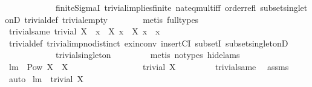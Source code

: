 \begin{isabellebody}
\ \ \ \ \ \ \ \ \ \ \ \ finite{\isacharunderscore}SigmaI\ trivial{\isacharunderscore}implies{\isacharunderscore}finite\ nat{\isacharunderscore}{}{\isacharunderscore}eq{\isacharunderscore}mult{\isacharunderscore}iff\ order{\isacharunderscore}refl\ subset{\isacharunderscore}singletonD\ trivial{\isacharunderscore}def\ trivial{\isacharunderscore}empty\isanewline
\ \ \ \ \ \ \isamarkupfalse%
\ {\isacharparenleft}metis\ {\isacharparenleft}full{\isacharunderscore}types{\isacharparenright}{\isacharparenright}%
\endisatagproof
{\isafoldproof}%
%
\isadelimproof
\isanewline
%
\endisadelimproof
\isanewline
{}\isamarkupfalse%
\ trivial{\isacharunderscore}same{\isacharcolon}\ {\isachardoublequoteopen}trivial\ X\ {\isacharequal}\ {\isacharparenleft}{\isasymforall}x{}\ {\isasymin}\ X{\isachardot}\ {\isasymforall}x{}\ {\isasymin}\ X{\isachardot}\ x{}\ {\isacharequal}\ x{}{\isacharparenright}{\isachardoublequoteclose}\ \isanewline
%
\isadelimproof
\ \ \ \ \ \ %
\endisadelimproof
%
\isatagproof
{}\isamarkupfalse%
\ trivial{\isacharunderscore}def\ trivial{\isacharunderscore}imp{\isacharunderscore}no{\isacharunderscore}distinct\ ex{\isacharunderscore}in{\isacharunderscore}conv\ insertCI\ subsetI\ subset{\isacharunderscore}singletonD\isanewline
\ \ \ \ \ \ \ \ \ \ \ \ trivial{\isacharunderscore}singleton\ \isanewline
\ \ \ \ \ \ \isamarkupfalse%
\ {\isacharparenleft}metis\ {\isacharparenleft}no{\isacharunderscore}types{\isacharcomma}\ hide{\isacharunderscore}lams{\isacharparenright}{\isacharparenright}%
\endisatagproof
{\isafoldproof}%
%
\isadelimproof
\isanewline
%
\endisadelimproof
\isanewline
{}\isamarkupfalse%
\ lm{}{}{\isacharcolon}\ \ {\isachardoublequoteopen}{\isacharparenleft}Pow\ X\ {\isasymsubseteq}\ {\isacharbraceleft}{\isacharbraceleft}{\isacharbraceright}{\isacharcomma}X{\isacharbraceright}{\isacharparenright}{\isachardoublequoteclose}\ \isanewline
\ \ \ \ \ \ \ \ \ \ \ \ \ \ \ \ {\isachardoublequoteopen}trivial\ X{\isachardoublequoteclose}\ \isanewline
%
\isadelimproof
\ \ \ \ \ \ %
\endisadelimproof
%
\isatagproof
{}\isamarkupfalse%
\ trivial{\isacharunderscore}same\ \isamarkupfalse%
\ assms\ \isamarkupfalse%
\ auto%
\endisatagproof
{\isafoldproof}%
%
\isadelimproof
\isanewline
%
\endisadelimproof
\isanewline
{}\isamarkupfalse%
\ lm{}{}{\isacharcolon}\ \ {\isachardoublequoteopen}trivial\ X{\isachardoublequoteclose}\ \isanewline

\end{isabellebody}

